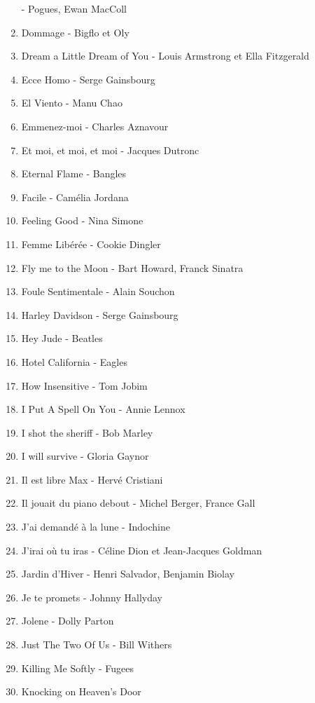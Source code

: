 \documentclass[12pt]{extarticle}
\begin{document}
\begin{multicols}{2}
\begin{enumerate}[nolistsep]
        - Pogues, Ewan MacColl
\item   Dommage
        - Bigflo et Oly
\item   Dream a Little Dream of You
        - Louis Armstrong et Ella Fitzgerald
\item   Ecce Homo
        - Serge Gainsbourg
\item   El Viento
        - Manu Chao
\item   Emmenez-moi
        - Charles Aznavour
\item   Et moi, et moi, et moi
        - Jacques Dutronc
\item   Eternal Flame
        - Bangles
\item   Facile
        - Camélia Jordana
\item   Feeling Good
        - Nina Simone
\item   Femme Libérée
        - Cookie Dingler
\item   Fly me to the Moon
        - Bart Howard, Franck Sinatra
\item   Foule Sentimentale
        - Alain Souchon
\item   Harley Davidson
        - Serge Gainsbourg
\item   Hey Jude
        - Beatles
\item   Hotel California
        - Eagles
\item   How Insensitive
        - Tom Jobim
\item   I Put A Spell On You
        - Annie Lennox
\item   I shot the sheriff
        - Bob Marley
\item   I will survive
        - Gloria Gaynor
\item   Il est libre Max
        - Hervé Cristiani
\item   Il jouait du piano debout
        - Michel Berger, France Gall
\item   J'ai demandé à la lune
        - Indochine
\item   J'irai où tu iras
        - Céline Dion et Jean-Jacques Goldman
\item   Jardin d'Hiver
        - Henri Salvador, Benjamin Biolay
\item   Je te promets
        - Johnny Hallyday
\item   Jolene
        - Dolly Parton
\item   Just The Two Of Us
        - Bill Withers
\item   Killing Me Softly
        - Fugees
\item   Knocking on Heaven's Door

\end{enumerate}
\end{multicols}
\end{document}

